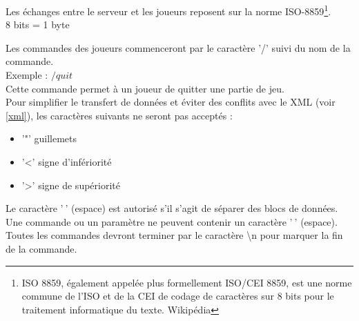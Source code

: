 



\par
Les échanges entre le serveur et les joueurs reposent sur la norme ISO-8859\footnote{ISO 8859, également appelée plus formellement ISO/CEI 8859, est une norme commune de l'ISO et de la CEI de codage de caractères sur 8 bits pour le traitement informatique du texte. Wikipédia}. \\

8 bits = 1 byte \\

\par
Les commandes des joueurs commenceront par le caractère '/' suivi du nom de la commande. \\
Exemple : $/quit$ \\
Cette commande permet à un joueur de quitter une partie de jeu. \\

Pour simplifier le transfert de données et éviter des conflits avec le XML (voir \ref{xml}), les caractères suivants ne seront pas acceptés : 

\begin{itemize}
	\item '"' guillemets
	\item '<' signe d'infériorité
	\item '>' signe de supériorité \\
\end{itemize}

Le caractère '$~$' (espace) est autorisé s'il s'agit de séparer des blocs de données. Une commande ou un paramètre ne peuvent contenir un caractère '$~$' (espace). \\

Toutes les commandes devront terminer par le caractère \textbackslash n pour marquer la fin de la commande.